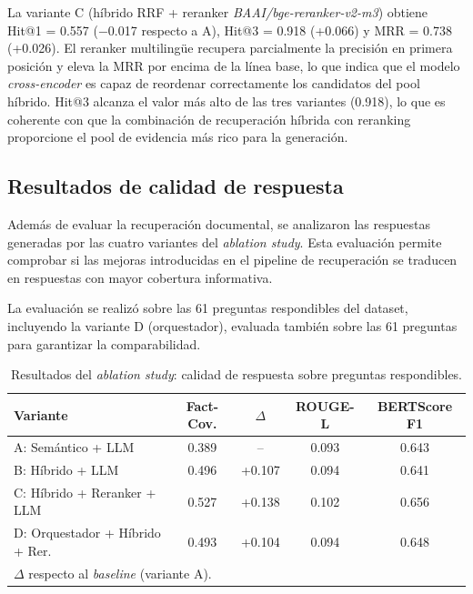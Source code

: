La variante C (híbrido RRF + reranker \textit{BAAI/bge-reranker-v2-m3}) obtiene Hit@1 = 0.557 ($-$0.017 respecto a A), Hit@3 = 0.918 (+0.066) y MRR = 0.738 (+0.026). 
El reranker multilingüe recupera parcialmente la precisión en primera posición y eleva la MRR por encima de la línea base, lo que indica que el modelo \textit{cross-encoder} es capaz de reordenar correctamente los candidatos del pool híbrido. Hit@3 alcanza el valor más alto de las tres variantes (0.918), lo que es coherente con que la combinación de recuperación híbrida con reranking proporcione el pool de evidencia más rico para la generación.

\subsection{Resultados de calidad de respuesta}\label{sec:resultados-respuesta}

Además de evaluar la recuperación documental, se analizaron las respuestas generadas por las cuatro variantes del \textit{ablation study}. 
Esta evaluación permite comprobar si las mejoras introducidas en el pipeline de recuperación se traducen en respuestas con mayor cobertura informativa.

La evaluación se realizó sobre las 61 preguntas respondibles del dataset, incluyendo la variante D (orquestador), evaluada también sobre las 61 preguntas para garantizar la comparabilidad.

\begin{table}[H]
\centering
\begin{tabular}{lcccc}
\toprule
\textbf{Variante} & \textbf{Fact-Cov.} & \textbf{$\Delta$} & \textbf{ROUGE-L} & \textbf{BERTScore F1} \\
\midrule
A: Semántico + LLM               & 0.389 & --      & 0.093 & 0.643 \\
B: Híbrido + LLM                 & 0.496 & +0.107  & 0.094 & 0.641 \\
C: Híbrido + Reranker + LLM      & 0.527 & +0.138  & 0.102 & 0.656 \\
D: Orquestador + Híbrido + Rer.  & 0.493 & +0.104  & 0.094 & 0.648 \\
\bottomrule
\multicolumn{5}{l}{\footnotesize $\Delta$ respecto al \textit{baseline} (variante A).}
\end{tabular}
\caption{Resultados del \textit{ablation study}: calidad de respuesta sobre preguntas respondibles.}
\label{tab:resultados-calidad-respuesta}
\end{table}

